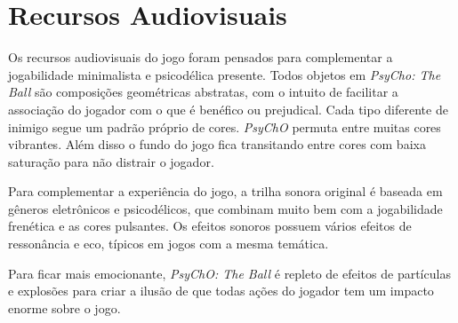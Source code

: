 \section{Recursos Audiovisuais}
\label{sec:audio_visuais}

Os recursos audiovisuais do jogo foram pensados para complementar a jogabilidade minimalista e psicodélica presente. Todos objetos em \textit{PsyCho: The Ball} são composições geométricas abstratas, com o intuito de facilitar a associação do jogador com o que é benéfico ou prejudical. Cada tipo diferente de inimigo segue um padrão próprio de cores. \textit{PsyChO} permuta entre muitas cores vibrantes. Além disso o fundo do jogo fica transitando entre cores com baixa saturação para não distrair o jogador.

Para complementar a experiência do jogo, a trilha sonora original é baseada em gêneros eletrônicos e psicodélicos, que combinam muito bem com a jogabilidade frenética e as cores pulsantes. Os efeitos sonoros possuem vários efeitos de ressonância e eco, típicos em jogos com a mesma temática.

Para ficar mais emocionante, \textit{PsyChO: The Ball} é repleto de efeitos de partículas e explosões para criar a ilusão de que todas ações do jogador tem um impacto enorme sobre o jogo.
